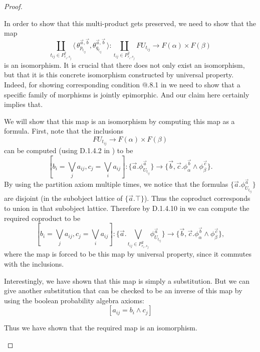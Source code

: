 \documentclass[a4paper]{amsproc}
\makeatletter
\theoremstyle{plain}
\theoremstyle{definition}
\theoremstyle{remark}
\numberwithin{equation}{section}
\newcommand{\la}{\langle\,}
\newcommand{\ra}{\,\rangle}
\newcommand{\Rmnum}[1]{\expandafter\@slowromancap\romannumeral #1@}
\makeatother
\begin{document}
\begin{proof}
\begin{enumerate}
        In order to show that this multi-product gets preserved, we need to show that the map
        \[
            \coprod_{t_{ij} \in P^2_{r_i,s_j}} \la \theta^{\vec{a},\vec{b}}_{p_{t_{ij}}}, \theta^{\vec{a},\vec{b}}_{q_{t_{ij}}} \ra : \coprod_{t_{ij} \in P^2_{r_i,s_j}} F U_{t_{ij}} \to F(\alpha) \times F(\beta)
        \]
        is an isomorphism. It is crucial that there does not only exist an isomorphism, but that it is this concrete isomorphism constructed by universal property. Indeed, for showing corresponding condition \Rmnum{7}.8.1 in \cite{sheaves_geometry_logic} we need to show that a specific family of morphisms is jointly epimorphic. And our claim here certainly implies that.

        We will show that this map is an isomorphism by computing this map as a formula. First, note that the inclusions
        \[
            FU_{t_{ij}} \to F(\alpha) \times F(\beta)
        \]
        can be computed (using D.1.4.2 in \cite{elephant}) to be
        \[
            [ b_i = \bigvee_j a_{ij}, c_j = \bigvee_i a_{ij} ] :\{ \vec{a}. \phi^{\vec{a}}_{U_{t_{ij}}} \} \to \{ \vec{b},\vec{c} . \phi^{\vec{b}}_{\alpha} \wedge \phi^{\vec{c}}_{\beta} \} .
        \]
        By using the partition axiom multiple times, we notice that the formulas $\{ \vec{a} . \phi^{\vec{a}}_{U_{t_{ij}}}\}$ are disjoint (in the subobject lattice of $\{ \vec{a} . \top \}$). Thus the coproduct corresponds to union in that subobject lattice. Therefore by D.1.4.10 in \cite{elephant} we can compute the required coproduct to be
        \[
            [ b_i = \bigvee_j a_{ij}, c_j = \bigvee_i a_{ij} ]: \{ \vec{a}.\bigvee_{t_{ij} \in P^2_{r_i,s_j} } \phi^{\vec{a}}_{U_{t_{ij}}} \} \to \{\vec{b},\vec{c} . \phi^{\vec{b}}_{\alpha} \wedge \phi^{\vec{c}}_{\beta}\},
        \]
        where the map is forced to be this map by universal property, since it commutes with the inclusions.

        Interestingly, we have shown that this map is simply a substitution. But we can give another substitution that can be checked to be an inverse of this map by using the boolean probability algebra axioms:
        \[
            [a_{ij} = b_i \wedge c_j]
        \]

        Thus we have shown that the required map is an isomorphism.


\end{enumerate}
\end{proof}
\end{document}
